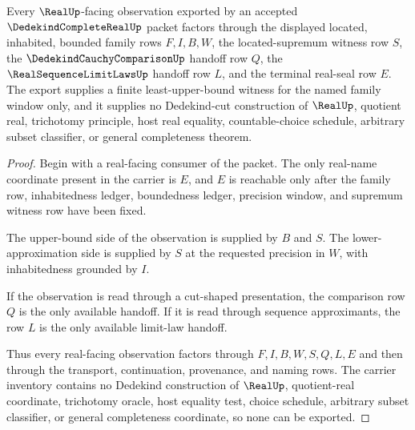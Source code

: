 \begin{theorem}
\label{thm:dedekind-complete-real-located-supremum-handoff}
Every $\RealUp$-facing observation exported by an accepted $\DedekindCompleteRealUp$ packet factors through the displayed located, inhabited, bounded family rows $F,I,B,W$, the located-supremum witness row $S$, the $\DedekindCauchyComparisonUp$ handoff row $Q$, the $\RealSequenceLimitLawsUp$ handoff row $L$, and the terminal real-seal row $E$. The export supplies a finite least-upper-bound witness for the named family window only, and it supplies no Dedekind-cut construction of $\RealUp$, quotient real, trichotomy principle, host real equality, countable-choice schedule, arbitrary subset classifier, or general completeness theorem.
\end{theorem}
\begin{proof}
Begin with a real-facing consumer of the packet. The only real-name coordinate present in the carrier is $E$, and $E$ is reachable only after the family row, inhabitedness ledger, boundedness ledger, precision window, and supremum witness row have been fixed.

The upper-bound side of the observation is supplied by $B$ and $S$. The lower-approximation side is supplied by $S$ at the requested precision in $W$, with inhabitedness grounded by $I$.

If the observation is read through a cut-shaped presentation, the comparison row $Q$ is the only available handoff. If it is read through sequence approximants, the row $L$ is the only available limit-law handoff.

Thus every real-facing observation factors through $F,I,B,W,S,Q,L,E$ and then through the transport, continuation, provenance, and naming rows. The carrier inventory contains no Dedekind construction of $\RealUp$, quotient-real coordinate, trichotomy oracle, host equality test, choice schedule, arbitrary subset classifier, or general completeness coordinate, so none can be exported.
\end{proof}


